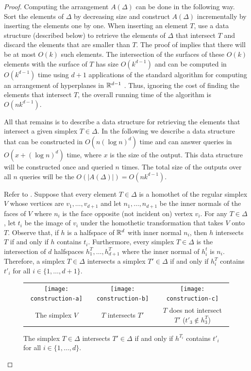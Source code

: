 \documentclass[lotsofwhite]{patmorin}
\begin{document}
\begin{proof}
  Computing the arrangement $A(\Delta)$ can be done in the following way.
  Sort the elements of $\Delta$ by decreasing size and construct $A(\Delta)$
  incrementally by inserting the elements one by one.  When inserting
  an element $T$, use a data structure (described below) to retrieve
  the elements of $\Delta$ that intersect $T$ and discard the elements
  that are smaller than $T$.  The proof of  implies
  that there will be at most $O(k)$ such elements.  The intersection
  of the surfaces of these $O(k)$ elements with the surface of $T$ has
  size $O(k^{d-1})$ and can be computed in $O(k^{d-1})$ time using $d+1$
  applications of the standard algorithm for computing an arrangement
  of hyperplanes in $\mathbb{R}^{d-1}$ \cite{eos86,ess93}.  Thus, ignoring the
  cost of finding the elements that intersect $T$, the overall running
  time of the algorithm is $O(nk^{d-1})$.

  All that remains is to describe a data structure for retrieving the
  elements that intersect a given simplex $T\in\Delta$.  In the following
  we describe a data structure that can be constructed in $O(n(\log
  n)^{d})$ time and can answer queries in $O(x + (\log n)^{d})$ time,
  where $x$ is the size of the output.  This data structure will be
  constructed once and queried $n$ times.  The total size of the outputs
  over all $n$ queries will be the $O(|A(\Delta)|)=O(nk^{d-1})$.

  Refer to .
  Suppose that every element $T\in\Delta$ is a homothet of the
  regular simplex $V$ whose vertices are $v_1,\ldots,v_{d+1}$ and let
  $n_1,\ldots,n_{d+1}$ be the inner normals of the faces of $V$ where
  $n_i$ is the face opposite (not incident on) vertex $v_i$.  For any
  $T\in\Delta$, let $t_i$ be the image of $v_i$ under the homothetic
  transformation that takes $V$ onto $T$.  Observe that, if $h$ is a
  halfspace of $\mathbb{R}^d$ with inner normal $n_i$,  then $h$ intersects $T$
  if and only if $h$ contains $t_i$.  Furthermore, every simplex $T\in
  \Delta$ is the intersection of $d$ halfspaces $h^T_1,\ldots,h^T_{d+1}$
  where the inner normal of $h^t_i$ is $n_i$.  Therefore, a simplex $T\in\Delta$
  intersects a simplex $T'\in\Delta$ if and only if $h^T_i$ contains $t'_i$
  for all $i\in\{1,\ldots,d+1\}$.

  \begin{figure}
    \begin{center}
      \begin{tabular}{ccc}
        \texttt{[image: construction-a]} & 
        \texttt{[image: construction-b]} & 
        \texttt{[image: construction-c]} \\
        The simplex $V$ & 
        $T$ intersects $T'$ & 
        $T$ does not intersect $T'$  ($t'_3 \not\in h^T_3$)
      \end{tabular}
    \end{center}
    \caption{The simplex $T\in \Delta$ intersects $T'\in\Delta$ if and
      only if $h^{T_i}$ contains $t'_i$ for all $i\in\{1,\ldots,d\}$.}
  \end{figure}


\end{proof}
\end{document}
